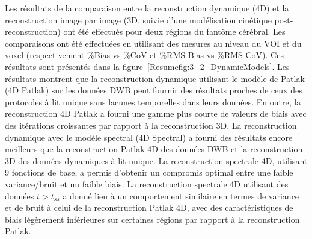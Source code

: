 Les résultats de la comparaison entre la reconstruction dynamique (4D) et la reconstruction image par image (3D, suivie d'une modélisation cinétique post-reconstruction) ont été effectués pour deux régions du fantôme cérébral. Les comparaisons ont été effectuées en utilisant des mesures au niveau du VOI et du voxel (respectivement \%Bias vs \%CoV et \%RMS Bias vs \%RMS CoV). Ces résultats sont présentés dans la figure~\ref{Resumefig:3_2_DynamicModels}.
Les résultats montrent que la reconstruction dynamique utilisant le modèle de Patlak (4D Patlak) sur les données DWB peut fournir des résultats proches de ceux des protocoles à lit unique sans lacunes temporelles dans leurs données. En outre, la reconstruction 4D Patlak a fourni une gamme plus courte de valeurs de biais avec des itérations croissantes par rapport à la reconstruction 3D. La reconstruction dynamique avec le modèle spectral (4D Spectral) a fourni des résultats encore meilleurs que la reconstruction Patlak 4D des données DWB et la reconstruction 3D des données dynamiques à lit unique. La reconstruction spectrale 4D, utilisant 9 fonctions de base, a permis d'obtenir un compromis optimal entre une faible variance/bruit et un faible biais. La reconstruction spectrale 4D utilisant des données $t > t_{ss}$ a donné lieu à un comportement similaire en termes de variance et de bruit à celui de la reconstruction Patlak 4D, avec des caractéristiques de biais légèrement inférieures sur certaines régions par rapport à la reconstruction Patlak.

